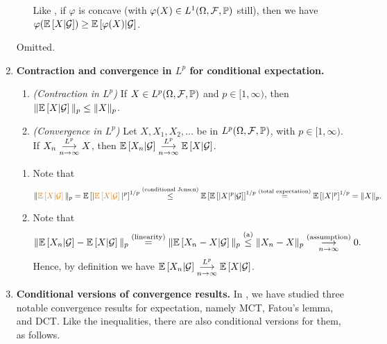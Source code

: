 \begin{enumerate}
\begin{enumerate}
\begin{note}
Like , if \(\varphi\) is concave (with
\(\varphi(X)\in L^{1}(\Omega,\mathcal{F},\mathbb{P})\) still), then we have
\(\varphi(\mathbb{E}\left[X|\mathcal{G}\right])\ge\mathbb{E}\left[\varphi(X)|\mathcal{G}\right]\).
\end{note}
\end{enumerate}
\begin{pf}
Omitted.
\end{pf}
\item \textbf{Contraction and convergence in \(L^{p}\) for conditional expectation.}
\begin{enumerate}
\item\label{it:cond-lp-contract} \emph{(Contraction in \(L^{p}\))}
If \(X\in L^{p}(\Omega,\mathcal{F},\mathbb{P})\) and \(p\in [1,\infty)\), then
\(\|\mathbb{E}\left[X|\mathcal{G}\right]\|_{p}\le\|X\|_{p}\).

\item \label{it:cond-lp-conv} \emph{(Convergence in \(L^{p}\))}
Let \(X,X_1,X_2,\dotsc\) be in \(L^{p}(\Omega,\mathcal{F},\mathbb{P})\), with
\(p\in[1,\infty)\).  If \(X_n\underset{n\to\infty}{\overset{L^p}{\longrightarrow}} X\), then
\(\mathbb{E}\left[X_n|\mathcal{G}\right]\underset{n\to\infty}{\overset{L^p}{\longrightarrow}}\mathbb{E}\left[X|\mathcal{G}\right]\).
\end{enumerate}
\begin{pf}
\begin{enumerate}
\item Note that
\[
\|\orc{\expv{X|\mathcal{G}}}\|_{p}=\expv{|\orc{\expv{X|\mathcal{G}}}|^{p}}^{1/p}
\overset{\text{(conditional Jensen)}}{\le}
\expv{\expv{|X|^{p}|\mathcal{G}}}^{1/p}
\overset{\text{(total expectation)}}{=}
\expv{|X|^{p}}^{1/p}=\|X\|_{p}.
\]
\item Note that
\[
\|\mathbb{E}\left[X_n|\mathcal{G}\right]-\mathbb{E}\left[X|\mathcal{G}\right]\|_{p}
\overset{\text{(linearity)}}{=}
\|\mathbb{E}\left[X_n-X|\mathcal{G}\right]\|_{p}
\overset{\text{(a)}}{\le}\|X_n-X\|_{p}\underset{n\to\infty}{\overset{\text{(assumption)}}{\longrightarrow}}0.
\]
Hence, by definition we have \(\mathbb{E}\left[X_n|\mathcal{G}\right]\underset{n\to\infty}{\overset{L^p}{\longrightarrow}}\mathbb{E}\left[X|\mathcal{G}\right]\).
\end{enumerate}
\end{pf}
\item \textbf{Conditional versions of convergence results.}
In , we have studied three notable convergence
results for expectation, namely MCT, Fatou's lemma, and DCT. Like the
inequalities, there are also conditional versions for them, as follows.


\end{enumerate}
